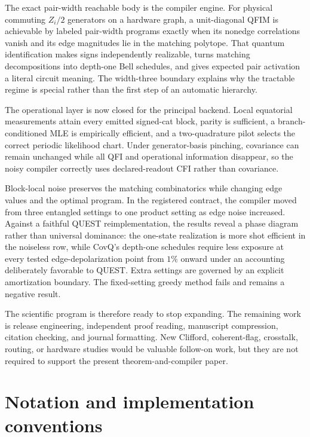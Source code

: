 \documentclass[11pt]{article}
\theoremstyle{definition}
\theoremstyle{remark}
\begin{document}
The exact pair-width reachable body is the compiler engine. For physical commuting $Z_i/2$ generators on a hardware graph, a unit-diagonal QFIM is achievable by labeled pair-width programs exactly when its nonedge correlations vanish and its edge magnitudes lie in the matching polytope. That quantum identification makes signs independently realizable, turns matching decompositions into depth-one Bell schedules, and gives expected pair activation a literal circuit meaning. The width-three boundary explains why the tractable regime is special rather than the first step of an automatic hierarchy.

The operational layer is now closed for the principal backend. Local equatorial measurements attain every emitted signed-cat block, parity is sufficient, a branch-conditioned MLE is empirically efficient, and a two-quadrature pilot selects the correct periodic likelihood chart. Under generator-basis pinching, covariance can remain unchanged while all QFI and operational information disappear, so the noisy compiler correctly uses declared-readout CFI rather than covariance.

Block-local noise preserves the matching combinatorics while changing edge values and the optimal program. In the registered contract, the compiler moved from three entangled settings to one product setting as edge noise increased. Against a faithful QUEST reimplementation, the results reveal a phase diagram rather than universal dominance: the one-state realization is more shot efficient in the noiseless row, while CovQ's depth-one schedules require less exposure at every tested edge-depolarization point from $1\%$ onward under an accounting deliberately favorable to QUEST. Extra settings are governed by an explicit amortization boundary. The fixed-setting greedy method fails and remains a negative result.

The scientific program is therefore ready to stop expanding. The remaining work is release engineering, independent proof reading, manuscript compression, citation checking, and journal formatting. New Clifford, coherent-flag, crosstalk, routing, or hardware studies would be valuable follow-on work, but they are not required to support the present theorem-and-compiler paper.

\appendix

\section{Notation and implementation conventions}
\end{document}
